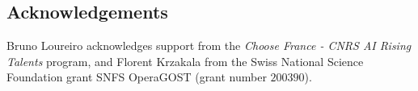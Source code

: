 \documentclass[a0paper,fleqn]{betterportraitposter}
\theoremstyle{plain}
\theoremstyle{definition}
\theoremstyle{remark}
\begin{document}
{\begin{multicols}{3}
\section{Acknowledgements}

Bruno Loureiro acknowledges support from the \textit{Choose France - CNRS AI Rising Talents} program, and Florent Krzakala from the Swiss National Science Foundation grant SNFS OperaGOST  (grant number $200390$).





\columnbreak

\end{multicols}
}





\end{document}
